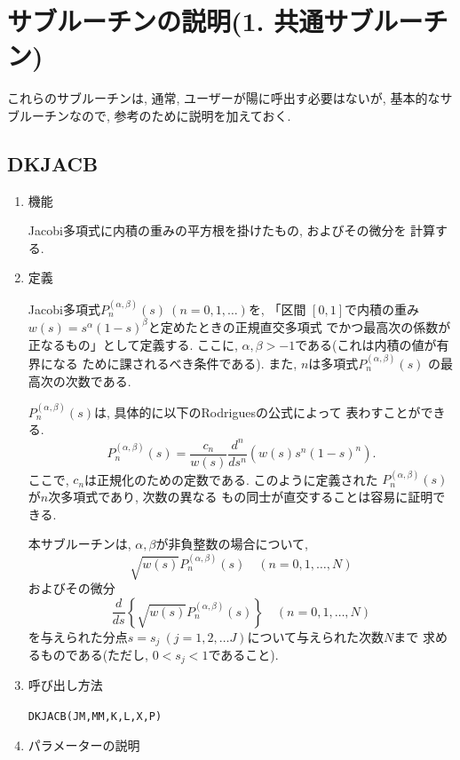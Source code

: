 \documentclass[a4j,fleqn]{jarticle}
\begin{document}

\section{サブルーチンの説明(1. 共通サブルーチン)}

これらのサブルーチンは, 通常, ユーザーが陽に呼出す必要はないが,
基本的なサブルーチンなので, 参考のために説明を加えておく.

\subsection{DKJACB}
\begin{enumerate}

\item 機能

Jacobi多項式に内積の重みの平方根を掛けたもの, およびその微分を
計算する.

\item 定義

Jacobi多項式$P^{(\alpha,\beta)}_n(s)\ (n=0,1,\ldots)$を,
「区間 $[0,1]$で内積の重み
$w(s)=s^{\alpha}(1-s)^{\beta}$と定めたときの正規直交多項式
でかつ最高次の係数が正なるもの」として定義する. 
ここに, $\alpha,\beta>-1$である(これは内積の値が有界になる
ために課されるべき条件である). また, $n$は多項式$P^{(\alpha,\beta)}_n(s)$
の最高次の次数である.

$P^{(\alpha,\beta)}_n(s)$は, 具体的に以下のRodriguesの公式によって
表わすことができる.
\[
P^{(\alpha,\beta)}_n(s)
=\frac{c_n}{w(s)}\frac{d^n}{ds^n}(w(s)s^n(1-s)^n).
\]
ここで, $c_n$は正規化のための定数である. このように定義された
$P^{(\alpha,\beta)}_n(s)$が$n$次多項式であり, 次数の異なる
もの同士が直交することは容易に証明できる.

本サブルーチンは, $\alpha,\beta$が非負整数の場合について, 
\[
\sqrt{w(s)}P^{(\alpha,\beta)}_n(s)\quad (n=0,1,\dots,N)
\]
およびその微分
\[
\frac{d}{ds}\left\{\sqrt{w(s)}P^{(\alpha,\beta)}_n(s)\right\}
\quad (n=0,1,\dots,N)
\]
を与えられた分点$s=s_j\ (j=1,2,\dots J)$について与えられた次数$N$まで
求めるものである(ただし, $0<s_j<1$であること).

\item 呼び出し方法

{\tt DKJACB(JM,MM,K,L,X,P)}
  
\item パラメーターの説明


\end{enumerate}
\end{document}
